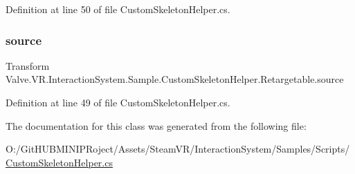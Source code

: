 Definition at line 50 of file Custom\+Skeleton\+Helper.\+cs.

\mbox{\label{class_valve_1_1_v_r_1_1_interaction_system_1_1_sample_1_1_custom_skeleton_helper_1_1_retargetable_a67db91af4a5dcdb39f9abf0ba38304cf}} 
\subsubsection{\texorpdfstring{source}{source}}
{\footnotesize\ttfamily Transform Valve.\+V\+R.\+Interaction\+System.\+Sample.\+Custom\+Skeleton\+Helper.\+Retargetable.\+source}



Definition at line 49 of file Custom\+Skeleton\+Helper.\+cs.



The documentation for this class was generated from the following file\+:\begin{DoxyCompactItemize}
\item 
O\+:/\+Git\+H\+U\+B\+M\+I\+N\+I\+P\+Roject/\+Assets/\+Steam\+V\+R/\+Interaction\+System/\+Samples/\+Scripts/\mbox{\hyperlink{_custom_skeleton_helper_8cs}{Custom\+Skeleton\+Helper.\+cs}}\end{DoxyCompactItemize}
